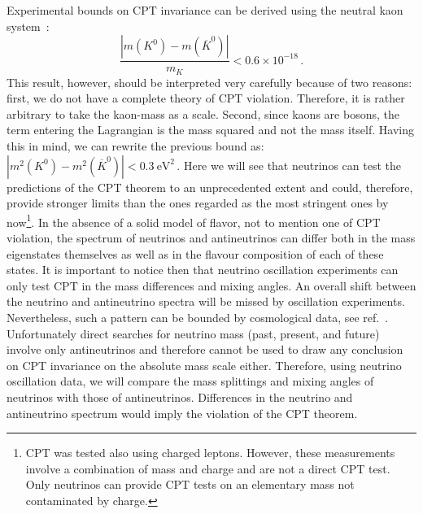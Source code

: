 Experimental bounds on CPT invariance can be derived using the neutral kaon system~\cite{Schwingenheuer:1995uf}:
%
\begin{equation}
  \frac{|m(K^0) - m(\overline{K}^0)|}{m_K} < 0.6 \times 10^{-18}\,. 
  \label{eq:mK}
\end{equation}
%
This result, however, should be interpreted very carefully because of two reasons: first, we do not have a complete theory of CPT violation. Therefore, it is rather arbitrary to take the kaon-mass as a scale. Second, since kaons are bosons, the term entering the Lagrangian is the mass squared and not the mass itself. Having this in mind, we can rewrite the previous bound as:
%
 $ |m^2(K^0) - m^2(\overline{K}^0)| < 0.3~\mbox{eV}^2 \, $.
%
Here we will see that neutrinos can test the predictions of the CPT theorem to an unprecedented extent and could, therefore, provide stronger limits than the ones regarded as the most stringent ones by now\footnote{CPT was tested also using charged leptons. However, these measurements involve a combination
of mass and charge and are not a direct CPT test. Only neutrinos can provide CPT tests on an elementary mass not contaminated by charge.}. 
%
In the absence of a solid model of flavor, not to mention one of CPT violation, the spectrum  of neutrinos and antineutrinos can differ both  in the mass eigenstates themselves as well as in the flavour composition of each of these states. It is important to notice then that neutrino oscillation experiments can  only test CPT in the mass differences and mixing angles. An overall shift between the neutrino and antineutrino spectra will be missed by oscillation experiments.  Nevertheless, such a pattern can be bounded by cosmological data, see ref.~\cite{Barenboim:2017vlc}. Unfortunately direct searches for neutrino mass (past, present, and future) involve only antineutrinos and therefore 
cannot be used to draw any conclusion on  CPT invariance on the absolute mass scale either.
%
Therefore, using neutrino oscillation data, we will compare the mass splittings and mixing angles of  neutrinos with those of antineutrinos. Differences in the neutrino and antineutrino spectrum would imply the violation of the CPT theorem.
